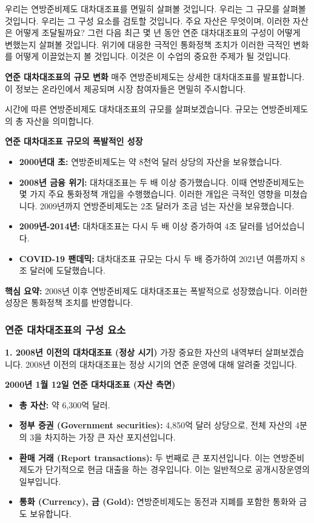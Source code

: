 \documentclass[11pt,a4paper]{article}
\begin{document}
우리는 연방준비제도 대차대조표를 면밀히 살펴볼 것입니다. 우리는 그 규모를 살펴볼 것입니다. 우리는 그 구성 요소를 검토할 것입니다. 주요 자산은 무엇이며, 이러한 자산은 어떻게 조달될까요? 그런 다음 최근 몇 년 동안 연준 대차대조표의 구성이 어떻게 변했는지 살펴볼 것입니다. 위기에 대응한 극적인 통화정책 조치가 이러한 극적인 변화를 어떻게 이끌었는지 볼 것입니다. 이것은 이 수업의 중요한 주제가 될 것입니다.

\textbf{연준 대차대조표의 규모 변화}
매주 연방준비제도는 상세한 대차대조표를 발표합니다. 이 정보는 온라인에서 제공되며 시장 참여자들은 면밀히 주시합니다.

시간에 따른 연방준비제도 대차대조표의 규모를 살펴보겠습니다. 규모는 연방준비제도의 총 자산을 의미합니다.

\begin{examplebox}
\textbf{연준 대차대조표 규모의 폭발적인 성장}
\begin{itemize}
    \item \textbf{2000년대 초:} 연방준비제도는 약 8천억 달러 상당의 자산을 보유했습니다.
    \item \textbf{2008년 금융 위기:} 대차대조표는 두 배 이상 증가했습니다. 이때 연방준비제도는 몇 가지 주요 통화정책 개입을 수행했습니다. 이러한 개입은 극적인 영향을 미쳤습니다. 2009년까지 연방준비제도는 2조 달러가 조금 넘는 자산을 보유했습니다.
    \item \textbf{2009년-2014년:} 대차대조표는 다시 두 배 이상 증가하여 4조 달러를 넘어섰습니다.
    \item \textbf{COVID-19 팬데믹:} 대차대조표 규모는 다시 두 배 증가하여 2021년 여름까지 8조 달러에 도달했습니다.
\end{itemize}
\textbf{핵심 요약:} 2008년 이후 연방준비제도 대차대조표는 폭발적으로 성장했습니다. 이러한 성장은 통화정책 조치를 반영합니다.
\end{examplebox}

\subsubsection*{연준 대차대조표의 구성 요소}

\textbf{1. 2008년 이전의 대차대조표 (정상 시기)}
가장 중요한 자산의 내역부터 살펴보겠습니다. 2008년 이전의 대차대조표는 정상 시기의 연준 운영에 대해 알려줄 것입니다.

\begin{examplebox}
\textbf{2000년 1월 12일 연준 대차대조표 (자산 측면)}
\begin{itemize}
    \item \textbf{총 자산:} 약 6,300억 달러.
    \item \textbf{정부 증권 (Government securities):} 4,850억 달러 상당으로, 전체 자산의 4분의 3을 차지하는 가장 큰 자산 포지션입니다.
    \item \textbf{환매 거래 (Report transactions):} 두 번째로 큰 포지션입니다. 이는 연방준비제도가 단기적으로 현금 대출을 하는 경우입니다. 이는 일반적으로 공개시장운영의 일부입니다.
    \item \textbf{통화 (Currency), 금 (Gold):} 연방준비제도는 동전과 지폐를 포함한 통화와 금도 보유합니다.
\end{itemize}
\end{examplebox}
\end{document}
